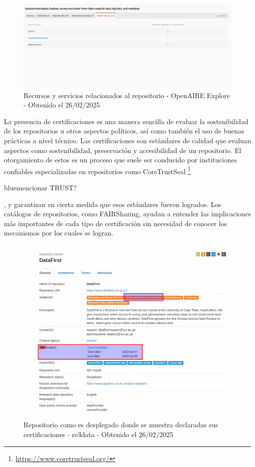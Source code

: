 \documentclass[runningheads]{llncs}
\def \bchgon {\begin{color}{blue}}
\def \echgon {\end{color}}
\begin{document}
\begin{figure}
    \centering
    \includegraphics[width=0.5\linewidth]{img/openaire_recursos_relacionados_a_repositorio.png}
    \caption{Recursos y servicios relacionados al repositorio - OpenAIRE Explore - Obtenido el 26/02/2025}
    \label{fig:openaire_recursos_relacionados_a_repositorio}
\end{figure}


La presencia de certificaciones es una manera sencilla de evaluar la sostenibilidad de los repositorios u otros aspectos políticos, así como también el uso de buenas prácticas a nivel técnico. Las certificaciones son estándares de calidad que evaluan aspectos como sostenibilidad, preservación y accesibilidad de un repositorio. El otorgamiento de estos es un proceso que suele ser conducido por instituciones confiables especializadas en repositorios como CoreTrustSeal \footnote{\url{https://www.coretrustseal.org/}} \bchgon mencionar TRUST?\echgon, y garantizan en cierta medida que esos estándares fueron logrados. Los catálogos de repositorios, como FAIRSharing, ayudan a entender las implicaciones más importantes de cada tipo de certificación sin necesidad de conocer los mecanismos por los cuales se logran.\\

\begin{figure}
    \centering
    \includegraphics[width=0.5\linewidth]{img/re3data_certified_repo.png}
    \caption{Repositorio como es desplegado donde se muestra declaradas sus certificaciones - re3data - Obtenido el 26/02/2025}
    \label{fig:re3data_certified_repo}
\end{figure}
\end{document}

